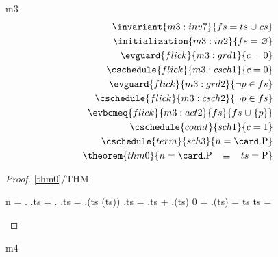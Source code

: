 \documentclass{article}
\begin{document}
\begin{machine}{m3}
	\begin{align}
		\invariant{m3:inv7}{ fs = ts \bunion cs } \\
		\initialization{m3:in2}{ fs = \emptyset } \\
		\evguard{flick}{m3:grd1}{ c = 0 } \\
		\cschedule{flick}{m3:csch1}{ c = 0 } \\
		\evguard{flick}{m3:grd2}{ \neg p \in fs } \\
		\cschedule{flick}{m3:csch2}{ \neg p \in fs } \\
		\evbcmeq{flick}{m3:act2}{fs}{ fs \bunion \{ p \} } \\
		\cschedule{count}{sch1}{c = 1} \\
		\cschedule{term}{sch3}{n = \card.\Pcs} \\
		\theorem{thm0}{n = \card.\Pcs \3\equiv ts = \Pcs}
	\end{align}
	
	\begin{proof}{\ref{thm0}/THM}
	\begin{calculation}	
		n = \card.\Pcs
	\hint{=}{ \eqref{m3:inv1} }
		\card.ts = \card.\Pcs
	\hint{=}{ }
		\card.ts = \card.(ts \bunion (\Pcs \setminus ts))
	\hint{=}{ }
		\card.ts = \card.ts + \card.(\Pcs \setminus ts)
	\hint{=}{ }
		0 = \card.(\Pcs \setminus ts)
	\hint{=}{ }
		\emptyset = \Pcs \setminus ts
	\hint{=}{ }
		ts = \Pcs
	\end{calculation}
	\end{proof}
\end{machine}

\begin{machine}{m4}
\end{machine}
\end{document}
